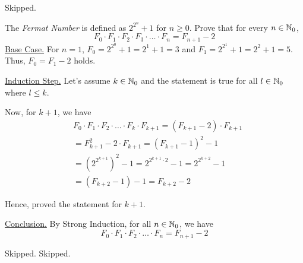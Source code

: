 \bp Skipped.\ep

\bp 
The \emph{Fermat Number} is defined as $2^{2^n} + 1$ for $n \geq 0$. Prove that for every $n \in \mathbb{N}_0$,
$$F_0 \cdot F_1 \cdot F_2 \cdot F_3 \cdot \ldots \cdot F_n = F_{n+1} - 2$$
\ep
\bs
\underline{Base Case.} For $n = 1$, $F_0 = 2^{2^0} + 1 = 2^1 + 1 = 3$ and $F_1 = 2^{2^1} + 1 = 2^2 + 1 = 5$. Thus, $F_0 = F_1 - 2$ holds.

\underline{Induction Step.} Let's assume $k \in \mathbb{N}_0$ and the statement is true for all $l \in \mathbb{N}_0$ where $l \leq k$. 

Now, for $k+1$, we have
\begin{align*}
	&F_0 \cdot F_1 \cdot F_2 \cdot \ldots \cdot F_k \cdot F_{k+1} 
		= (F_{k+1} - 2) \cdot F_{k+1} \\
	&= F_{k+1}^2 - 2 \cdot F_{k+1} 
		= (F_{k+1} - 1)^2 - 1 \\
	&= (2^{2^{k+1}})^2 - 1
		= 2^{2^{k+1} \cdot 2} - 1 = 2^{2^{k+2}} - 1 \\
	&= (F_{k+2} - 1) - 1
		= F_{k+2} - 2
\end{align*}

Hence, proved the statement for $k+1$.

\underline{Conclusion.} By Strong Induction, for all $n \in \mathbb{N}_0$, we have
$$F_0 \cdot F_1 \cdot F_2 \cdot \ldots \cdot F_n = F_{n+1} - 2$$
\es


\bp Skipped. \ep
\bp Skipped. \ep
